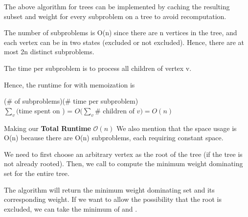\documentclass{article}
\begin{document}
\begin{solution}
\begin{quote}
\begin{steps}
\end{steps}
\end{quote}
\begin{subproof}

The above algorithm for trees can be implemented by caching the resulting subset and weight for every subproblem on a tree  to avoid recomputation.

The number of subproblems is O(n) since there are n vertices in the tree, and each vertex can be in two states (excluded or not excluded). Hence, there are at most 2n distinct subproblems.

The time per subproblem is to process all children of vertex v.

Hence, the runtime for  with memoization is
\begin{center}
(\# of subproblems)(\# time per subproblem)\\
$\sum_v($time spent on ) = $O\bigg(\sum_v\#$ children of $v\bigg) = O(n)$
\end{center}

Making our \textbf{Total Runtime} $\mathcal{O}(n)$
We also mention that the space usage is O(n) because there are O(n) subproblems, each requiring constant space.

\end{subproof}
\begin{subproof}
We need to first choose an arbitrary vertex as the root of the tree (if the tree is not already rooted). Then, we call  to compute the minimum weight dominating set for the entire tree.

The algorithm will return the minimum weight dominating set and its corresponding weight. If we want to allow the possibility that the root is excluded, we can take the minimum of  and .
\end{subproof}
\end{solution}
\pagebreak
\end{document}
